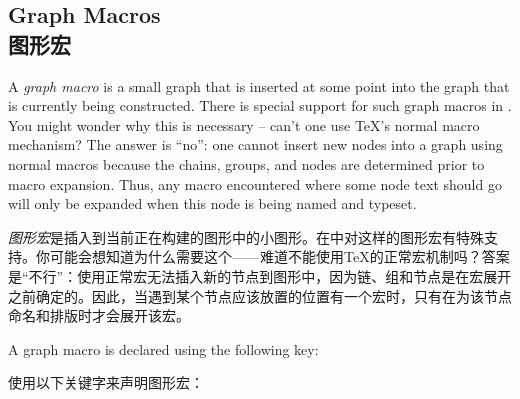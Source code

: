\subsection{Graph Macros\\图形宏}
\label{section-library-graphs-macros}

A \emph{graph macro} is a small graph that is inserted at some point into the
graph that is currently being constructed. There is special support for such
graph macros in \tikzname. You might wonder why this is necessary -- can't one
use \TeX's normal macro mechanism? The answer is ``no'': one cannot insert new
nodes into a graph using normal macros because the chains, groups, and nodes
are determined prior to macro expansion. Thus, any macro encountered where some
node text should go will only be expanded when this node is being named and
typeset.

\emph{图形宏}是插入到当前正在构建的图形中的小图形。在\tikzname 中对这样的图形宏有特殊支持。你可能会想知道为什么需要这个——难道不能使用\TeX 的正常宏机制吗？答案是“不行”：使用正常宏无法插入新的节点到图形中，因为链、组和节点是在宏展开之前确定的。因此，当遇到某个节点应该放置的位置有一个宏时，只有在为该节点命名和排版时才会展开该宏。

A graph macro is declared using the following key:

使用以下关键字来声明图形宏：

